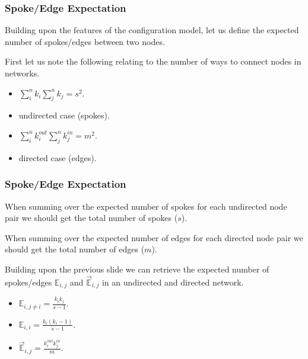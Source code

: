 \documentclass{beamer}
\newcommand{\ds}{\displaystyle}
\begin{document}

\begin{frame}

    \frametitle{Spoke/Edge Expectation}

    Building upon the features of the configuration model, let us define the expected number of spokes/edges between two nodes.\pause

    \vspace{2.5mm}
    First let us note the following relating to the number of ways to connect nodes in networks.\pause

    \vspace{2.5mm}
    \begin{itemize}
        \item $ \ds \sum_{i}^{n} k_{i} \sum_{j}^{n} k_{j} = s^{2} $.\pause
        \item[$\diamond$] undirected case (spokes).\pause
        \item $ \ds \sum_{i}^{n} k_{i}^{out} \sum_{j}^{n} k_{j}^{in} = m^{2} $.\pause
        \item[$\diamond$] directed case (edges).
    \end{itemize}

\end{frame}

\begin{frame}

    \frametitle{Spoke/Edge Expectation}

    When summing over the expected number of spokes for each undirected node pair we should get the total number of spokes ($ s $).\pause

    \vspace{2.5mm}
    When summing over the expected number of edges for each directed node pair we should get the total number of edges ($ m $).\pause

    \vspace{2.5mm}
    Building upon the previous slide we can retrieve the expected number of spokes/edges $ \mathbb{E}_{i, j} $ and $ \vec{\mathbb{E}}_{i, j} $ in an undirected and directed network.\pause

    \vspace{2.5mm}
    \begin{itemize}
        \item $ \ds \mathbb{E}_{i, j \ne i} = \frac{k_{i} k_{j}}{s - 1} $.\pause
        \item $ \ds \mathbb{E}_{i, i} = \frac{k_{i} (k_{i} - 1)}{s - 1} $.\pause
        \item $ \ds \vec{\mathbb{E}}_{i, j} = \frac{k_{i}^{out} k_{j}^{in}}{m} $.
    \end{itemize}

\end{frame}
\end{document}
